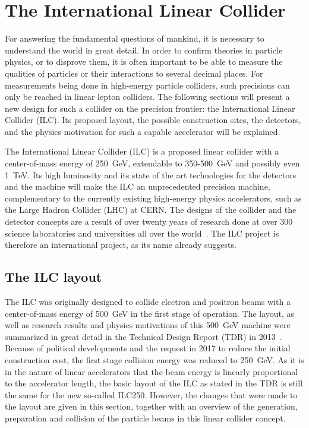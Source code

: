 \chapter{The International Linear Collider}
\label{ILC}
\begin{chapterabstract}
For answering the fundamental questions of mankind, it is necessary to understand the world in great detail.
In order to confirm theories in particle physics, or to disprove them, it is often important to be able to measure the qualities of particles or their interactions to several decimal places.
For measurements being done in high-energy particle colliders, such precisions can only be reached in linear lepton colliders.
The following sections will present a new design for such a collider on the precision frontier: the International Linear Collider (ILC). 
Its proposed layout, the possible construction sites, the detectors, and the physics motivation for such a capable accelerator will be explained.
\end{chapterabstract}
\newline

The International Linear Collider (ILC) is a proposed linear \positron\electron collider with a center-of-mass energy of \SI{250}{\GeV}, extendable to 350-\SI{500}{\GeV} and possibly even \SI{1}{\TeV}.
Its high luminosity and its state of the art technologies for the detectors and the machine will make the ILC an unprecedented precision machine, complementary to the currently existing high-energy physics accelerators, such as the Large Hadron Collider (LHC) at CERN.
The designs of the collider and the detector concepts are a result of over twenty years of research done at over 300 science laboratories and universities all over the world~\cite{TDR1}.
The ILC project is therefore an international project, as its name already suggests.

\section{The ILC layout}
\label{ILC:layout}
The ILC was originally designed to collide electron and positron beams with a center-of-mass energy of \SI{500}{\GeV} in the first stage of operation.
The layout, as well as research results and physics motivations of this \SI{500}{\GeV} machine were summarized in great detail in the Technical Design Report (TDR) in 2013~\cite{TDR}.
Because of political developments and the request in 2017 to reduce the initial construction cost, the first stage collision energy was reduced to \SI{250}{\GeV}.
As it is in the nature of linear accelerators that the beam energy is linearly proportional to the accelerator length, the basic layout of the ILC as stated in the TDR is still the same for the new so-called ILC250.
However, the changes that were made to the layout are given in this section, together with an overview of the generation, preparation and collision of the particle beams in this linear collider concept.

